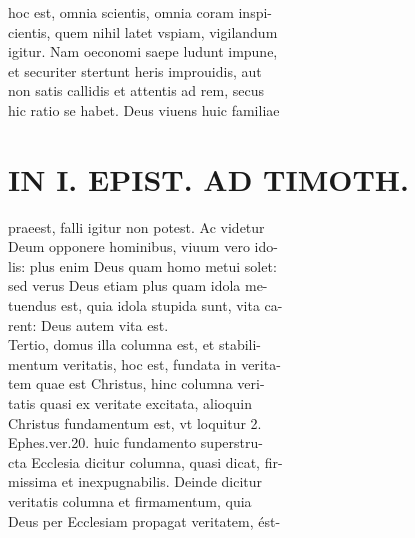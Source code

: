 \documentclass{article}
\begin{document}
\begin{pages}
                hoc est, omnia scientis, omnia coram inspi- \\
                cientis, quem nihil latet vspiam, vigilandum \\
                igitur. Nam oeconomi saepe ludunt impune, \\
                et securiter stertunt heris improuidis, aut \\
                non satis callidis et attentis ad rem, secus \\
                hic ratio se habet. Deus viuens huic familiae \\
                
\section*{IN I. EPIST. AD TIMOTH. \\
                }
praeest, falli igitur non potest. Ac videtur \\
                Deum opponere hominibus, viuum vero ido- \\
                lis: plus enim Deus quam homo metui solet: \\
                sed verus Deus etiam plus quam idola me- \\
                tuendus est, quia idola stupida sunt, vita ca- \\
                rent: Deus autem vita est. \\
                Tertio, domus illa columna est, et stabili- \\
                mentum veritatis, hoc est, fundata in verita- \\
                tem quae est Christus, hinc columna veri- \\
                tatis quasi ex veritate excitata, alioquin \\
                Christus fundamentum est, vt loquitur 2. \\
                Ephes.ver.20. huic fundamento superstru- \\
                cta Ecclesia dicitur columna, quasi dicat, fir- \\
                missima et inexpugnabilis. Deinde dicitur \\
                veritatis columna et firmamentum, quia \\
                Deus per Ecclesiam propagat veritatem, ést- \\

\end{pages}
\end{document}

